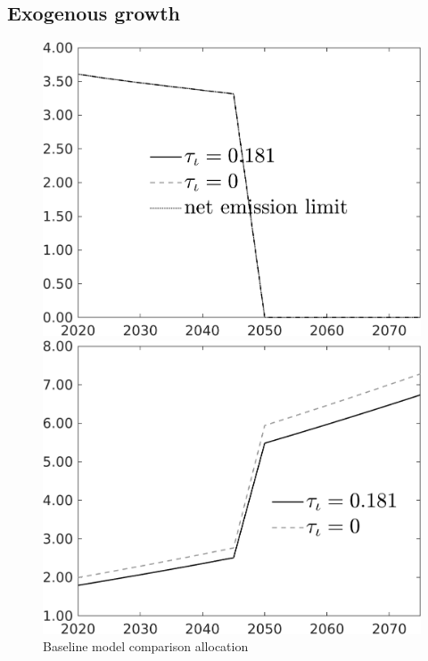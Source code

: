 \documentclass[12pt]{article}
\begin{document}
\subsection{Exogenous growth}
\begin{figure}[h!!]
	\centering
	\caption{Baseline model comparison allocation}\label{fig:Leveltauf_nsk0_xgr1_notaul}
	\begin{minipage}[]{0.32\textwidth}
		\includegraphics[width=1\textwidth]{../../codding_model/own_basedOnFried/optimalPol_010922_revision/figures/all_13Sept22/CompTauf_bytaul_Reg0_Emnet_spillover0_nsk0_xgr1_knspil0_sep0_LFlimit1_emsbase0_countec0_GovRev0_etaa0.79_lgd1.png}
	\end{minipage}		
	\begin{minipage}[]{0.32\textwidth}
		\includegraphics[width=1\textwidth]{../../codding_model/own_basedOnFried/optimalPol_010922_revision/figures/all_13Sept22/CompTauf_bytaul_Reg0_tauf_spillover0_nsk0_xgr1_knspil0_sep0_LFlimit1_emsbase0_countec0_GovRev0_etaa0.79_lgd1.png}

\end{minipage}
\end{figure}
\end{document}
